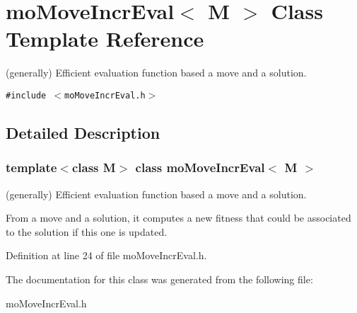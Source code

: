\section{mo\-Move\-Incr\-Eval$<$ M $>$ Class Template Reference}
\label{classmo_move_incr_eval}
(generally) Efficient evaluation function based a move and a solution.  


{\tt \#include $<$mo\-Move\-Incr\-Eval.h$>$}



\subsection{Detailed Description}
\subsubsection*{template$<$class M$>$ class mo\-Move\-Incr\-Eval$<$ M $>$}

(generally) Efficient evaluation function based a move and a solution. 

From a move and a solution, it computes a new fitness that could be associated to the solution if this one is updated. 



Definition at line 24 of file mo\-Move\-Incr\-Eval.h.

The documentation for this class was generated from the following file:\begin{CompactItemize}
\item 
mo\-Move\-Incr\-Eval.h\end{CompactItemize}
